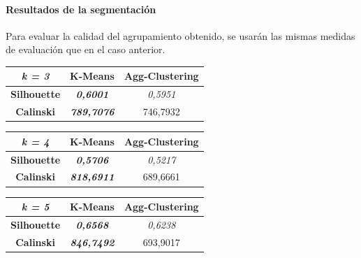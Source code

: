 \paragraph{Resultados de la segmentación}

Para evaluar la calidad del agrupamiento obtenido, se usarán las mismas medidas de evaluación que en el caso anterior.

\begin{table}[H]
\begin{subtable}[H]{0.45\textwidth}
        \centering
\begin{tabular}{|c|c|c|}
\hline
\textit{k = 3}      & \textbf{K-Means}           & \textbf{Agg-Clustering} \\ \hline
\textbf{Silhouette} & \textit{\textbf{0,6001}}   & \textit{0,5951}         \\ \hline
\textbf{Calinski}   & \textit{\textbf{789,7076}} & 746,7932                \\ \hline
\end{tabular}
\end{subtable}
\hfill
\begin{subtable}[H]{0.45\textwidth}
        \centering
\begin{tabular}{|c|c|c|}
\hline
\textit{k = 4}      & \textbf{K-Means}           & \textbf{Agg-Clustering} \\ \hline
\textbf{Silhouette} & \textit{\textbf{0,5706}}   & \textit{0,5217}         \\ \hline
\textbf{Calinski}   & \textit{\textbf{818,6911}} & 689,6661                \\ \hline
\end{tabular}
\end{subtable}
\begin{subtable}[H]{0.45\textwidth}
        \centering
\begin{tabular}{|c|c|c|}
\hline
\textit{k = 5}      & \textbf{K-Means}           & \textbf{Agg-Clustering} \\ \hline
\textbf{Silhouette} & \textit{\textbf{0,6568}}   & \textit{0,6238}         \\ \hline
\textbf{Calinski}   & \textit{\textbf{846,7492}} & 693,9017                \\ \hline
\end{tabular}
\end{subtable}
\hfill
\begin{subtable}[H]{0.45\textwidth}
        \centering
\begin{tabular}{|c|c|c|}
\hline

\end{tabular}
\end{subtable}
\end{table}
